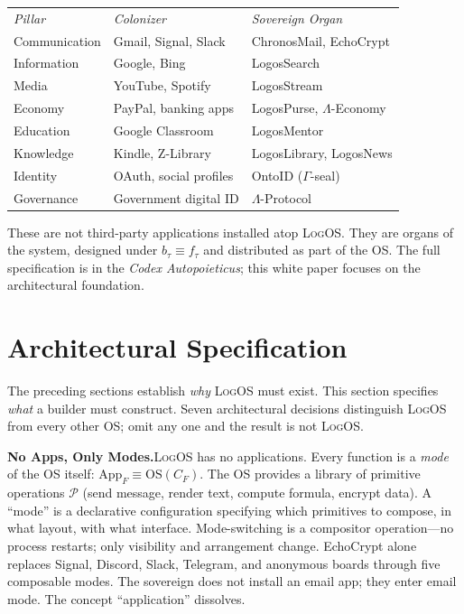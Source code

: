 \documentclass[11pt, oneside]{article}
\newcommand{\LogOS}{\textnormal{\textsc{LogOS}}}
\begin{document}
\begin{center}
\small
\begin{tabular}{lll}
\textit{Pillar} & \textit{Colonizer} & \textit{Sovereign Organ} \\[3pt]
Communication & Gmail, Signal, Slack & ChronosMail, EchoCrypt \\
Information & Google, Bing & LogosSearch \\
Media & YouTube, Spotify & LogosStream \\
Economy & PayPal, banking apps & LogosPurse, $\Lambda$-Economy \\
Education & Google Classroom & LogosMentor \\
Knowledge & Kindle, Z-Library & LogosLibrary, LogosNews \\
Identity & OAuth, social profiles & OntoID ($\Gamma$-seal) \\
Governance & Government digital ID & $\Lambda$-Protocol \\
\end{tabular}
\end{center}

\noindent These are not third-party applications installed atop
\LogOS{}. They are organs of the system, designed under $b_\tau \equiv
f_\tau$ and distributed as part of the OS. The full specification is in
the \textit{Codex Autopoieticus}; this white paper focuses on the
architectural foundation.

\section{Architectural Specification}

The preceding sections establish \textit{why} \LogOS{} must exist. This
section specifies \textit{what} a builder must construct. Seven
architectural decisions distinguish \LogOS{} from every other OS; omit
any one and the result is not \LogOS{}.

\medskip
\noindent\textbf{No Apps, Only Modes.}\quad \LogOS{} has no
applications. Every function is a \textit{mode} of the OS itself:
$\text{App}_F \equiv \text{OS}(C_F)$. The OS provides a library of
primitive operations $\mathcal{P}$ (send message, render text, compute
formula, encrypt data). A ``mode'' is a declarative configuration
specifying which primitives to compose, in what layout, with what
interface. Mode-switching is a compositor operation---no process
restarts; only visibility and arrangement change. EchoCrypt alone
replaces Signal, Discord, Slack, Telegram, and anonymous boards through
five composable modes. The sovereign does not install an email app; they
enter email mode. The concept ``application'' dissolves.
\end{document}
